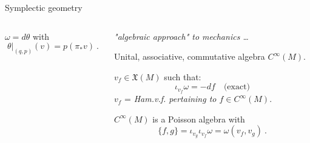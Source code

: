 \documentclass[handout,10pt]{beamer}
\begin{document}
\begin{frame}{Symplectic geometry}
\begin{columns}[T]
\begin{column}{.50\linewidth}
\begin{columns}
\begin{column}{.50\linewidth}
\begin{center}
				\end{center}
			\end{column}	
		\end{columns}
		\begin{defblock}
				
		\end{defblock}
		\begin{exblock}[$M = T^\ast Q$ is symplectic]
			$\omega = d \theta $ with
			$$ \left.\theta\right\vert_{(q,p)} (v) = p (\pi_\ast v) ~.$$
		\end{exblock}
	\end{column}
	\vrule{}
	\pause
	\begin{column}{.50\linewidth}
		\centering
		\textit{ "algebraic approach" to mechanics \dots}
		\vspace{1em}	
		\begin{defblock}
			Unital, associative, commutative algebra $C^\infty(M)$.
		\end{defblock}
		\vspace{1em}
		\pause
		\begin{defblock}
			$v_f \in \mathfrak{X}(M)$ such that:
			$$\iota_{v_f} \omega = -df \quad \text{(exact)}$$ %
			\small$v_f$ = \emph{Ham.v.f. pertaining to $f\in C^\infty(M)$}.
		\end{defblock}
		\begin{defblock}
			$C^\infty(M)$ is a Poisson algebra with
			$$\{f,g\} = \iota_{v_g} \iota_{v_f} \omega = \omega(v_f,v_g) ~.$$
		\end{defblock}
	\end{column}
\end{columns}
\end{frame}
\end{document}
